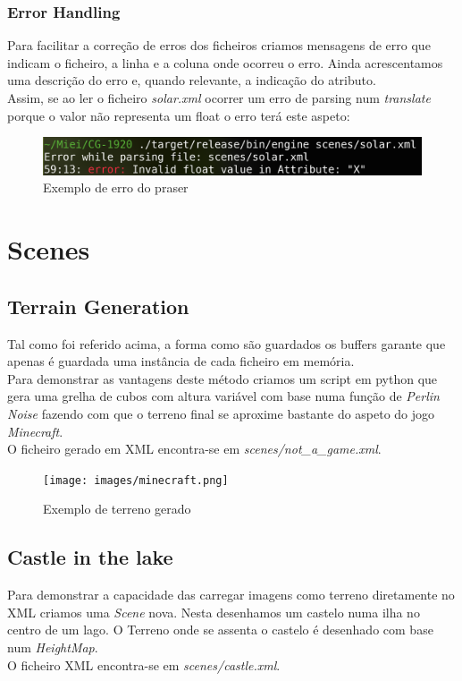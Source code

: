 \documentclass[a4paper]{report}
\begin{document}
\subsection{Error Handling}
Para facilitar a correção de erros dos ficheiros criamos mensagens de erro que
indicam o ficheiro, a linha e a coluna onde ocorreu o erro. Ainda acrescentamos
uma descrição do erro e, quando relevante, a indicação do atributo.\\
Assim, se ao ler o ficheiro \textit{solar.xml} ocorrer um erro de parsing num
\textit{translate} porque o valor não representa um float o erro terá este
aspeto:
\begin{figure}[H]
    \centering 
    \includegraphics[width=\textwidth]{images/error_handling.png}  
    \caption{Exemplo de erro do praser}
\end{figure}

\chapter{Scenes}
\section{Terrain Generation}
Tal como foi referido acima, a forma como são guardados os buffers garante que
apenas é guardada uma instância de cada ficheiro em memória. \\
Para demonstrar as vantagens deste método criamos um script em python que gera
uma grelha de cubos com altura variável com base numa função de \textit{Perlin
Noise} fazendo com que o terreno final se aproxime bastante do aspeto do jogo
\textit{Minecraft}.\\
O ficheiro gerado em XML encontra-se em \textit{scenes/not\_a\_game.xml}.

\begin{figure}[H]
    \centering 
    \texttt{[image: images/minecraft.png]}  
    \caption{Exemplo de terreno gerado}
\end{figure}

\section{Castle in the lake}
Para demonstrar a capacidade das carregar imagens como terreno diretamente no
XML criamos uma \textit{Scene} nova. Nesta desenhamos um castelo numa ilha no
centro de um lago. O Terreno onde se assenta o castelo é desenhado com base num
\textit{HeightMap}.\\
O ficheiro XML encontra-se em \textit{scenes/castle.xml}.
\end{document}
